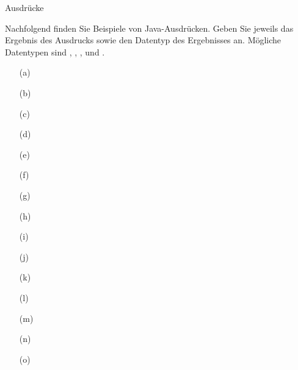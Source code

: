 \begin{frame}[t]%
\medskip

\begin{exercise}{Ausdrücke}

\begin{body}
Nachfolgend finden Sie Beispiele von Java-Ausdr\"ucken.
Geben Sie jeweils das Ergebnis des Ausdrucks sowie den Datentyp des Ergebnisses an.
M\"ogliche Datentypen sind , , ,  und .
\begin{center}
\begin{minipage}{0.3\textwidth}
\begin{itemize}
\item[(a)] 
\item[(b)] 
\item[(c)] 
\item[(d)] 
\item[(e)] 
\end{itemize}
\end{minipage}
\begin{minipage}{0.3\textwidth}
\begin{itemize}
\item[(f)] 
\item[(g)] 
\item[(h)] 
\item[(i)] 
\item[(j)] 
\end{itemize}
\end{minipage}
\begin{minipage}{0.3\textwidth}
\begin{itemize}
\item[(k)] 
\item[(l)] 
\item[(m)] 
\item[(n)] 
\item[(o)] 
\end{itemize}
\end{minipage}
\end{center}
\end{body}

\begin{solution}


\end{solution}
\end{exercise}
\end{frame}

